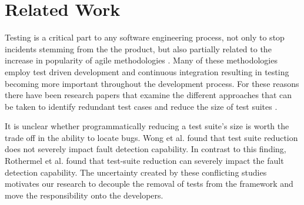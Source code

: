 \section{Related Work}
\label{relatedworkRef}
Testing is a critical part to any software engineering process, not only to stop incidents stemming from the the product, but also partially related to the increase in popularity of agile methodologies \cite{chaos}. Many of these methodologies employ test driven development and continuous integration resulting in testing becoming more important throughout the development process. For these reasons there have been research papers that examine the different approaches that can be taken to identify redundant test cases and reduce the size of test suites \cite{wong1995effect, wong1999test, rothermel1998empirical, rothermel2002empirical,koochakzadeh2009test,zhang2011empirical,li2008static}.

It is unclear whether programmatically reducing a test suite's size is worth the trade off in the ability to locate bugs.  Wong et al. \cite{wong1995effect, wong1999test} found that test suite reduction does not severely impact fault detection capability. In contrast to this finding, Rothermel et al. \cite{rothermel1998empirical, rothermel2002empirical} found that test-suite reduction can severely impact the fault detection capability. The uncertainty created by these conflicting studies motivates our research to decouple the removal of tests from the framework and move the responsibility onto the developers. 

